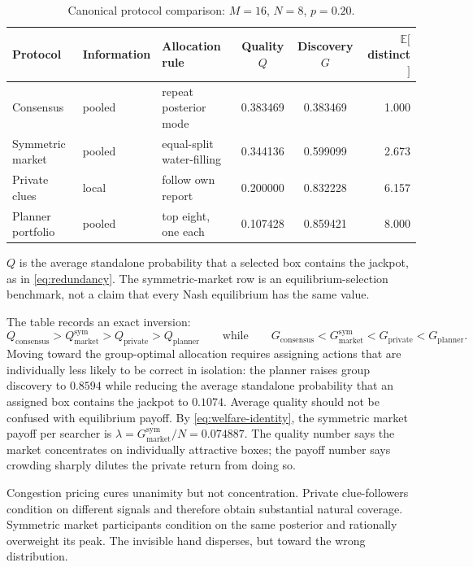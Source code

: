 \documentclass[11pt]{article}
\theoremstyle{definition}
\theoremstyle{remark}
\newcommand{\E}{\mathbb{E}}
\newcommand{\1}{\mathbf{1}}
\newcommand{\priv}{\mathrm{private}}
\newcommand{\cons}{\mathrm{consensus}}
\newcommand{\mkt}{\mathrm{market}}
\newcommand{\plan}{\mathrm{planner}}
\begin{document}
\begin{table}[t]
\centering
\caption{Canonical protocol comparison: $M=16$, $N=8$, $p=0.20$.}
\label{tab:canonical}
\begin{threeparttable}
\begin{tabular}{lllccr}
\toprule
Protocol & Information & Allocation rule & Quality $Q$ & Discovery $G$ & $\E[$distinct$]$\\
\midrule
Consensus & pooled & repeat posterior mode & 0.383469 & 0.383469 & 1.000\\
Symmetric market & pooled & equal-split water-filling & 0.344136 & 0.599099 & 2.673\\
Private clues & local & follow own report & 0.200000 & 0.832228 & 6.157\\
Planner portfolio & pooled & top eight, one each & 0.107428 & 0.859421 & 8.000\\
\bottomrule
\end{tabular}
\begin{tablenotes}[flushleft]\footnotesize
\item $Q$ is the average standalone probability that a selected box contains the jackpot, as in \cref{eq:redundancy}. The symmetric-market row is an equilibrium-selection benchmark, not a claim that every Nash equilibrium has the same value.
\end{tablenotes}
\end{threeparttable}
\end{table}
\FloatBarrier

The table records an exact inversion:
\[
Q_{\cons}>Q_{\mkt}^{\mathrm{sym}}>Q_{\priv}>Q_{\plan}
\qquad\text{while}\qquad
G_{\cons}<G_{\mkt}^{\mathrm{sym}}<G_{\priv}<G_{\plan}.
\]
Moving toward the group-optimal allocation requires assigning actions that are individually less likely to be correct in isolation: the planner raises group discovery to $0.8594$ while reducing the average standalone probability that an assigned box contains the jackpot to $0.1074$. Average quality should not be confused with equilibrium payoff. By \cref{eq:welfare-identity}, the symmetric market payoff per searcher is $\lambda=G_{\mkt}^{\mathrm{sym}}/N=0.074887$. The quality number says the market concentrates on individually attractive boxes; the payoff number says crowding sharply dilutes the private return from doing so.

Congestion pricing cures unanimity but not concentration. Private clue-followers condition on different signals and therefore obtain substantial natural coverage. Symmetric market participants condition on the same posterior and rationally overweight its peak. The invisible hand disperses, but toward the wrong distribution.
\end{document}
